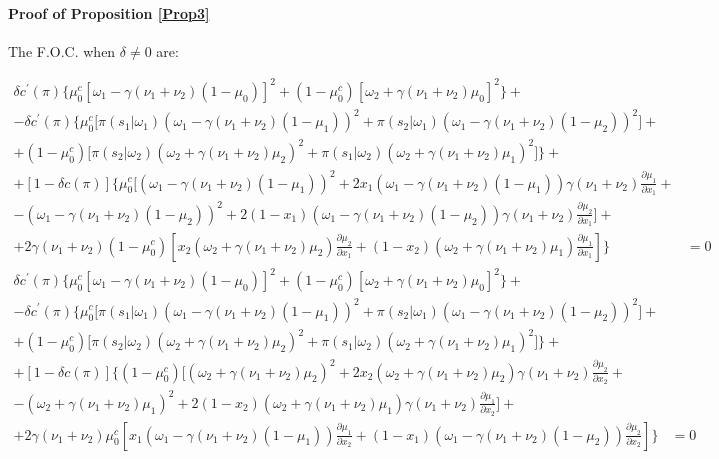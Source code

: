 \documentclass[12pt,a4paper]{article}
\begin{document}
\paragraph{Proof of Proposition \ref{Prop3}}
The F.O.C. when $\delta\neq 0$ are:
\begin{small}
\begin{equation}
    \begin{split}
        \delta c^\prime(\pi)\Bigg\{\mu_0^c\left[\omega_1-\gamma(\nu_1+\nu_2)(1-\mu_0)\right]^2+(1-\mu_0^c)\left[\omega_2+\gamma(\nu_1+\nu_2)\mu_0\right]^2\Bigg\}+ &\\
        -\delta c^\prime(\pi)\Bigg\{\mu_0^c\bigg[\pi(s_1|\omega_1)(\omega_1-\gamma (\nu_1+\nu_2) (1-\mu_1))^2+\pi(s_2|\omega_1)(\omega_1-\gamma (\nu_1+\nu_2) (1-\mu_2))^2\bigg]+ & \\
        +(1-\mu_0^c)\bigg[\pi(s_2|\omega_2)(\omega_2+\gamma (\nu_1+\nu_2) \mu_2)^2+\pi(s_1|\omega_2)(\omega_2+\gamma (\nu_1+\nu_2) \mu_1)^2 \bigg]\Bigg\}+ & \\
        +[1-\delta c(\pi)]\Bigg\{\mu_0^c\Bigg[(\omega_1-\gamma(\nu_1+\nu_2)(1-\mu_1))^2+2x_1(\omega_1-\gamma(\nu_1+\nu_2)(1-\mu_1))\gamma(\nu_1+\nu_2)\frac{\partial \mu_1}{\partial x_1}+ & \\
        -(\omega_1-\gamma(\nu_1+\nu_2)(1-\mu_2))^2+2(1-x_1)(\omega_1-\gamma(\nu_1+\nu_2)(1-\mu_2))\gamma(\nu_1+\nu_2)\frac{\partial \mu_2}{\partial x_1}\Bigg]+ &\\
        +2\gamma(\nu_1+\nu_2)(1-\mu_0^c)\left[x_2(\omega_2+\gamma(\nu_1+\nu_2)\mu_2)\frac{\partial \mu_2}{\partial x_1}+(1-x_2)(\omega_2+\gamma(\nu_1+\nu_2)\mu_1)\frac{\partial \mu_1}{\partial x_1}\right]\Bigg\} & =0
    \end{split} 
\end{equation}
\begin{equation}
    \begin{split}
    \delta c^\prime(\pi)\Bigg\{\mu_0^c\left[\omega_1-\gamma(\nu_1+\nu_2)(1-\mu_0)\right]^2+(1-\mu_0^c)\left[\omega_2+\gamma(\nu_1+\nu_2)\mu_0\right]^2\Bigg\}+ &\\
    -\delta c^\prime(\pi)\Bigg\{\mu_0^c\bigg[\pi(s_1|\omega_1)(\omega_1-\gamma (\nu_1+\nu_2) (1-\mu_1))^2+\pi(s_2|\omega_1)(\omega_1-\gamma (\nu_1+\nu_2) (1-\mu_2))^2\bigg]+ & \\
    +(1-\mu_0^c)\bigg[\pi(s_2|\omega_2)(\omega_2+\gamma (\nu_1+\nu_2) \mu_2)^2+\pi(s_1|\omega_2)(\omega_2+\gamma (\nu_1+\nu_2) \mu_1)^2 \bigg]\Bigg\}+ & \\
    +[1-\delta c(\pi)]\Bigg\{
    (1-\mu_0^c)\Bigg[(\omega_2+\gamma(\nu_1+\nu_2)\mu_2)^2+2x_2(\omega_2+\gamma(\nu_1+\nu_2)\mu_2)\gamma(\nu_1+\nu_2)\frac{\partial \mu_2}{\partial x_2}+ & \\
    -(\omega_2+\gamma(\nu_1+\nu_2)\mu_1)^2+2(1-x_2)(\omega_2+\gamma(\nu_1+\nu_2)\mu_1)\gamma(\nu_1+\nu_2)\frac{\partial \mu_1}{\partial x_2}\Bigg]+ & \\
    +2\gamma(\nu_1+\nu_2)\mu_0^c\left[x_1(\omega_1-\gamma(\nu_1+\nu_2)(1-\mu_1))\frac{\partial \mu_1}{\partial x_2}+(1-x_1)(\omega_1-\gamma(\nu_1+\nu_2)(1-\mu_2))\frac{\partial \mu_2}{\partial x_2}\right]\Bigg\} & =0
    \end{split}
\end{equation}
\end{small}
\end{document}
